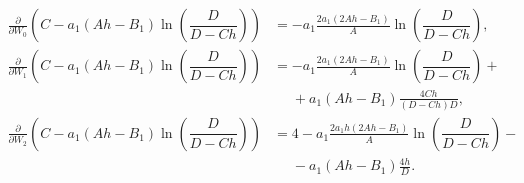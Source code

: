 \documentclass[a4paper,14pt]{article}
\begin{document}
\begin{equation*}
  \begin{aligned}
    \frac{\partial }{\partial W_0} \left(
    C - a_1 (A h - B_1)
    \ln \left( \dfrac{D}{D - C h} \right)
    \right)
    &=
      - a_1 \frac{2 a_1 (2 A h - B_1)}{A}
      \ln \left( \dfrac{D}{D - C h} \right),
      \\
    \frac{\partial }{\partial W_1} \left(
    C - a_1 (A h - B_1)
    \ln \left( \dfrac{D}{D - C h} \right)
    \right)
    &=
      - a_1 \frac{2 a_1 (2 A h - B_1)}{A}
      \ln \left( \dfrac{D}{D - C h} \right) + \\
    &\phantom{=}
      + a_1 (A h - B_1)
      \frac{4 C h}{(D - C h) D},
      \\
    \frac{\partial }{\partial W_2} \left(
    C - a_1 (A h - B_1)
    \ln \left( \dfrac{D}{D - C h} \right)
    \right)
    &=
      4
      - a_1 \frac{2 a_1 h (2 A h - B_1)}{A}
      \ln \left( \dfrac{D}{D - C h} \right) - \\
    &\phantom{=}
      - a_1 (A h - B_1)
      \frac{4 h}{D}.
  \end{aligned}
\end{equation*}
\end{document}
